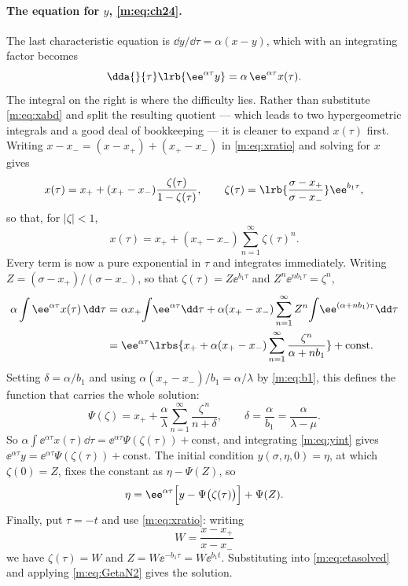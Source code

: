 \paragraph{The equation for $y$, \eqref{m:eq:ch24}.}
The last characteristic equation is $\dd y/\dd\tau = \alpha(x-y)$, which with an
integrating factor becomes
\begin{equation}
\label{m:eq:yint}
\dda{}{\tau}\lrb{\ee^{\alpha\tau}y} = \alpha\,\ee^{\alpha\tau}x(\tau) .
\end{equation}
The integral on the right is where the difficulty lies. Rather than substitute
\cref{m:eq:xabd} and split the resulting quotient --- which leads to two
hypergeometric integrals and a good deal of bookkeeping --- it is cleaner to expand
$x(\tau)$ first. Writing $x-x_- = (x-x_+)+(x_+-x_-)$ in \cref{m:eq:xratio} and
solving for $x$ gives
\begin{equation}
\label{m:eq:xgeom}
x(\tau) = x_+ + (x_+-x_-)\frac{\zeta(\tau)}{1-\zeta(\tau)},
\qquad
\zeta(\tau) = \lrb{\frac{\sigma-x_+}{\sigma-x_-}}\ee^{b_1\tau},
\end{equation}
so that, for $|\zeta|<1$,
\begin{equation*}
x(\tau) = x_+ + (x_+-x_-)\sum_{n=1}^{\infty}\zeta(\tau)^n .
\end{equation*}
Every term is now a pure exponential in $\tau$ and integrates immediately. Writing
$Z = (\sigma-x_+)/(\sigma-x_-)$, so that $\zeta(\tau) = Z\ee^{b_1\tau}$ and
$Z^n\ee^{nb_1\tau} = \zeta^n$,
\begin{align*}
\alpha\int\ee^{\alpha\tau}x(\tau)\,\dd\tau
&= \alpha x_+\!\int\!\ee^{\alpha\tau}\dd\tau
 + \alpha(x_+-x_-)\sum_{n=1}^{\infty}Z^n\!\int\!\ee^{(\alpha+nb_1)\tau}\dd\tau\\
&= \ee^{\alpha\tau}\lrbs{x_+ + \alpha(x_+-x_-)\sum_{n=1}^{\infty}\frac{\zeta^n}{\alpha+nb_1}}
 + \text{const} .
\end{align*}
Setting $\delta = \alpha/b_1$ and using $\alpha(x_+-x_-)/b_1 = \alpha/\lambda$ by
\cref{m:eq:b1}, this defines the function that carries the whole solution:
\begin{equation}
\label{m:eq:Psidef}
\Psi(\zeta) = x_+ + \frac{\alpha}{\lambda}\sum_{n=1}^{\infty}\frac{\zeta^{\,n}}{n+\delta},
\qquad
\delta = \frac{\alpha}{b_1} = \frac{\alpha}{\lambda-\mu} .
\end{equation}
So $\alpha\int\ee^{\alpha\tau}x(\tau)\dd\tau = \ee^{\alpha\tau}\Psi(\zeta(\tau)) + \text{const}$,
and integrating \cref{m:eq:yint} gives
$\ee^{\alpha\tau}y = \ee^{\alpha\tau}\Psi(\zeta(\tau)) + \text{const}$. The initial
condition $y(\sigma,\eta,0)=\eta$, at which $\zeta(0)=Z$, fixes the constant as
$\eta-\Psi(Z)$, so
\begin{equation}
\label{m:eq:etasolved}
\eta = \ee^{\alpha\tau}\Bigl[y-\Psi\bigl(\zeta(\tau)\bigr)\Bigr] + \Psi(Z) .
\end{equation}
Finally, put $\tau=-t$ and use \cref{m:eq:xratio}: writing
\begin{equation*}
W = \frac{x-x_+}{x-x_-}
\end{equation*}
we have $\zeta(\tau) = W$ and $Z = W\ee^{-b_1\tau} = W\ee^{b_1t}$. Substituting into
\cref{m:eq:etasolved} and applying \cref{m:eq:GetaN2} gives the solution.

